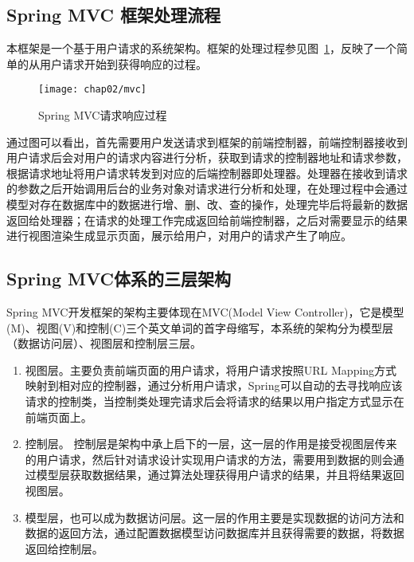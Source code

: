 \subsection{Spring MVC 框架处理流程}

本框架是一个基于用户请求的系统架构。框架的处理过程参见图~\ref{fig:mvc}，反映了一个简单的从用户请求开始到获得响应的过程。

\begin{figure}[H] %
  \centering
  \texttt{[image: chap02/mvc]}
  \caption{Spring MVC请求响应过程}
  \label{fig:mvc}
\end{figure}

通过图可以看出，首先需要用户发送请求到框架的前端控制器，前端控制器接收到用户请求后会对用户的请求内容进行分析，获取到请求的控制器地址和请求参数，根据请求地址将用户请求转发到对应的后端控制器即处理器。处理器在接收到请求的参数之后开始调用后台的业务对象对请求进行分析和处理，在处理过程中会通过模型对存在数据库中的数据进行增、删、改、查的操作，处理完毕后将最新的数据返回给处理器；在请求的处理工作完成返回给前端控制器，之后对需要显示的结果进行视图渲染生成显示页面，展示给用户，对用户的请求产生了响应\cite{李守振2006web}。

\subsection{Spring MVC体系的三层架构}
Spring MVC开发框架的架构主要体现在MVC(Model View Controller)，它是模型(M)、视图(V)和控制(C)三个英文单词的首字母缩写，本系统的架构分为模型层（数据访问层）、视图层和控制层三层。

\begin{enumerate}

\item 视图层。主要负责前端页面的用户请求，将用户请求按照URL Mapping方式映射到相对应的控制器，通过分析用户请求，Spring可以自动的去寻找响应该请求的控制类，当控制类处理完请求后会将请求的结果以用户指定方式显示在前端页面上。

\item 控制层。 控制层是架构中承上启下的一层，这一层的作用是接受视图层传来的用户请求，然后针对请求设计实现用户请求的方法，需要用到数据的则会通过模型层获取数据结果，通过算法处理获得用户请求的结果，并且将结果返回视图层。

\item 模型层，也可以成为数据访问层。这一层的作用主要是实现数据的访问方法和数据的返回方法，通过配置数据模型访问数据库并且获得需要的数据，将数据返回给控制层。

\end{enumerate}


